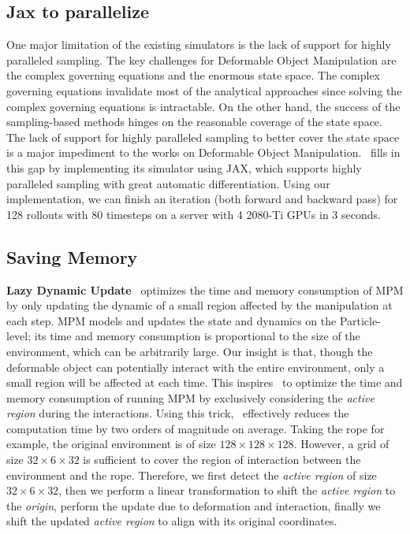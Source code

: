 \subsection{Jax to parallelize}
\label{sec:jax}
One major limitation of the existing simulators is the lack of support for highly paralleled sampling. The key challenges for Deformable Object Manipulation are the complex governing equations and the enormous state space. The complex governing equations invalidate most of the analytical approaches since solving the complex governing equations is intractable. On the other hand, the success of the sampling-based methods hinges on the reasonable coverage of the state space. The lack of support for highly paralleled sampling to better cover the state space is a major impediment to the works on Deformable Object Manipulation. \algo\ fills in this gap by implementing its simulator using JAX, which supports highly paralleled sampling with great automatic differentiation. Using our implementation, we can finish an iteration (both forward and backward pass) for 128 rollouts with 80 timesteps on a server with 4 2080-Ti GPUs in 3 seconds.

\subsection{Saving Memory}
\label{sec:saving_memory}
\textbf{Lazy Dynamic Update} \algo\ optimizes the time and memory consumption of MPM by only updating the dynamic of a small region affected by the manipulation at each step. MPM models and updates the state and dynamics on the Particle-level; its time and memory consumption is proportional to the size of the environment, which can be arbitrarily large. Our insight is that, though the deformable object can potentially interact with the entire environment, only a small region will be affected at each time. 
This inspires \algo\ to optimize the time and memory consumption of running MPM by exclusively considering the \textit{active region} during the interactions. Using this trick, \algo\ effectively reduces the computation time by two orders of magnitude on average. Taking the rope for example, the original environment is of size $128 \times 128 \times 128$. However, a grid of size $32 \times 6 \times 32$ is sufficient to cover the region of interaction between the environment and the rope. Therefore, we first detect the \textit{active region} of size $32 \times 6 \times 32$, then we perform a linear transformation to shift the \textit{active region} to the \textit{origin}, perform the update due to deformation and interaction, finally we shift the updated \textit{active region} to align with its original coordinates.


